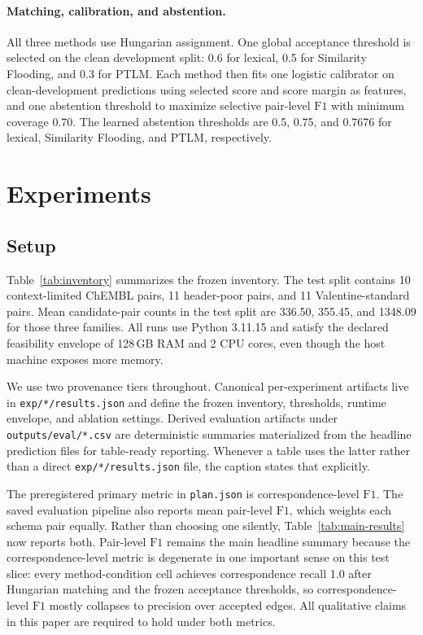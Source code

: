 \documentclass{article}
\newcommand{\fone}{\mbox{$\mathrm{F1}$}}
\begin{document}
\paragraph{Matching, calibration, and abstention.}
All three methods use Hungarian assignment. One global acceptance threshold is selected on the clean development split: 0.6 for lexical, 0.5 for Similarity Flooding, and 0.3 for PTLM. Each method then fits one logistic calibrator on clean-development predictions using selected score and score margin as features, and one abstention threshold to maximize selective pair-level \fone{} with minimum coverage 0.70. The learned abstention thresholds are 0.5, 0.75, and 0.7676 for lexical, Similarity Flooding, and PTLM, respectively.

\section{Experiments}
\label{sec:experiments}

\subsection{Setup}

Table~\ref{tab:inventory} summarizes the frozen inventory. The test split contains 10 context-limited ChEMBL pairs, 11 header-poor pairs, and 11 Valentine-standard pairs. Mean candidate-pair counts in the test split are 336.50, 355.45, and 1348.09 for those three families. All runs use Python 3.11.15 and satisfy the declared feasibility envelope of 128\,GB RAM and 2 CPU cores, even though the host machine exposes more memory.

We use two provenance tiers throughout. Canonical per-experiment artifacts live in \texttt{exp/*/results.json} and define the frozen inventory, thresholds, runtime envelope, and ablation settings. Derived evaluation artifacts under \texttt{outputs/eval/*.csv} are deterministic summaries materialized from the headline prediction files for table-ready reporting. Whenever a table uses the latter rather than a direct \texttt{exp/*/results.json} file, the caption states that explicitly.

The preregistered primary metric in \texttt{plan.json} is correspondence-level \fone{}. The saved evaluation pipeline also reports mean pair-level \fone{}, which weights each schema pair equally. Rather than choosing one silently, Table~\ref{tab:main-results} now reports both. Pair-level \fone{} remains the main headline summary because the correspondence-level metric is degenerate in one important sense on this test slice: every method-condition cell achieves correspondence recall 1.0 after Hungarian matching and the frozen acceptance thresholds, so correspondence-level \fone{} mostly collapses to precision over accepted edges. All qualitative claims in this paper are required to hold under both metrics.
\end{document}
